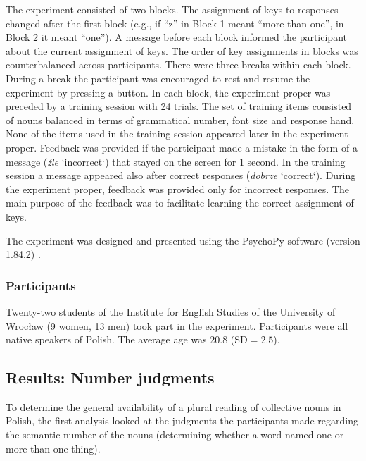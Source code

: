 \documentclass[output=paper]{langscibook}
\begin{document}
The experiment consisted of two blocks. The assignment of keys to responses changed after the first block (e.g., if “z” in Block 1 meant “more than one”, in Block 2 it meant “one”). A message before each block informed the participant about the current assignment of keys. The order of key assignments in blocks was counterbalanced across participants. There were three breaks within each block. During a break the participant was encouraged to rest and resume the experiment by pressing a button. In each block, the experiment proper was preceded by a training session with 24 trials. The set of training items consisted of nouns balanced in terms of grammatical number, font size and response hand. None of the items used in the training session appeared later in the experiment proper. Feedback was provided if the participant made a mistake in the form of a message (\textit{źle} ‘incorrect‘) that stayed on the screen for 1 second. In the training session a message appeared also after correct responses (\textit{dobrze} ‘correct‘). During the experiment proper, feedback was provided only for incorrect responses. The main purpose of the feedback was to facilitate learning the correct assignment of keys. 

The experiment was designed and presented using the PsychoPy software (version 1.84.2) \citep{peircePsychoPyPsychophysicsSoftware2007, peirceGeneratingStimuliNeuroscience2009}.

\subsubsection{Participants}
Twenty-two students of the Institute for English Studies of the University of Wrocław (9 women, 13 men) took part in the experiment. Participants were all native speakers of Polish. The average age was 20.8 ($\text{SD}=2.5$).

\subsection{Results: Number judgments}\largerpage
To determine the general availability of a plural reading of collective nouns in Polish, the first analysis looked at the judgments the participants made regarding the semantic number of the nouns (determining whether a word named one or more than one thing).
\end{document}
